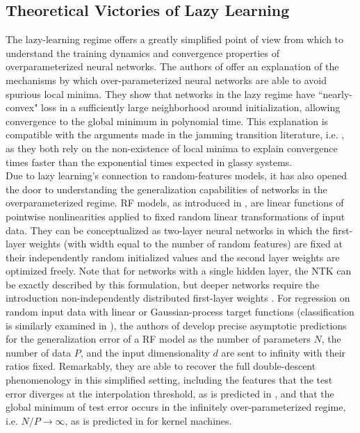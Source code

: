 \documentclass[a4paper, 12pt]{article}
\begin{document}
\subsection{Theoretical Victories of Lazy Learning}

The lazy-learning regime offers a greatly simplified point of view from which to understand the training dynamics and convergence properties of overparameterized neural networks. The authors of \cite{allen-zhuConvergenceTheoryDeep2019} offer an explanation of the mechanisms by which over-parameterized neural networks are able to avoid spurious local minima. They show that networks in the lazy regime have ``nearly-convex" loss in a sufficiently large neighborhood around initialization, allowing convergence to the global minimum in polynomial time. This explanation is compatible with the arguments made in the jamming transition literature, i.e. \cite{geigerJammingTransitionParadigm2019,spiglerJammingTransitionOverparametrization2019}, as they both rely on the non-existence of local minima to explain convergence times faster than the exponential times expected in glassy systems.\\

Due to lazy learning's connection to random-features models, it has also opened the door to understanding the generalization capabilities of networks in the overparameterized regime. RF models, as introduced in \cite{rahimiRandomFeaturesLargeScale2008}, are linear functions of pointwise nonlinearities applied to fixed random linear transformations of input data. They can be conceptualized as two-layer neural networks in which the first-layer weights (with width equal to the number of random features) are fixed at their independently random initialized values and the second layer weights are optimized freely. Note that for networks with a single hidden layer, the NTK can be exactly described by this formulation, but deeper networks require the introduction non-independently distributed first-layer weights \cite{chizatLazyTrainingDifferentiable2020}. For regression on random input data with linear or Gaussian-process target functions (classification is similarly examined in \cite{dengModelDoubleDescent2020}), the authors of \cite{meiGeneralizationErrorRandom2019} develop precise asymptotic predictions for the generalization error of a RF model as the number of parameters $N$, the number of data $P$, and the input dimensionality $d$ are sent to infinity with their ratios fixed. Remarkably, they are able to recover the full double-descent phenomenology in this simplified setting, including the features that the test error diverges at the interpolation threshold, as is predicted in \cite{geigerScalingDescriptionGeneralization2019}, and that the global minimum of test error occurs in the infinitely over-parameterized regime, i.e. $N/P\rightarrow\infty$, as is predicted in \cite{belkinReconcilingModernMachine2019,belkinUnderstandDeepLearning2018} for kernel machines.\\
\end{document}
